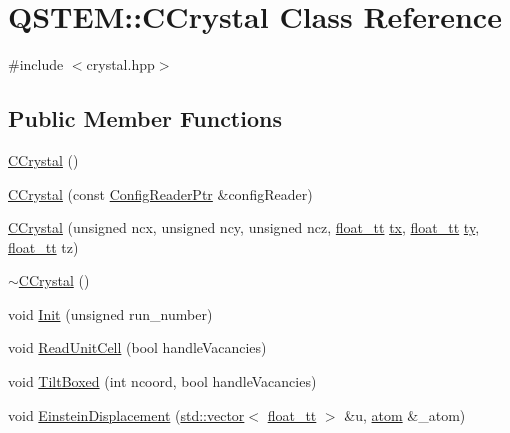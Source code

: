 \hypertarget{class_q_s_t_e_m_1_1_c_crystal}{\section{Q\-S\-T\-E\-M\-:\-:C\-Crystal Class Reference}
\label{class_q_s_t_e_m_1_1_c_crystal}
}


{\ttfamily \#include $<$crystal.\-hpp$>$}

\subsection*{Public Member Functions}
\begin{DoxyCompactItemize}
\item 
\hyperlink{class_q_s_t_e_m_1_1_c_crystal_ac9068f4a3798963697e9f804477f0486}{C\-Crystal} ()
\item 
\hyperlink{class_q_s_t_e_m_1_1_c_crystal_a97daa385f46bb4656053ac5f382a1159}{C\-Crystal} (const \hyperlink{namespace_q_s_t_e_m_af9424707fe9f6503298f49b41304bd35}{Config\-Reader\-Ptr} \&config\-Reader)
\item 
\hyperlink{class_q_s_t_e_m_1_1_c_crystal_a7f441c23bbf66862185ba1746bb66134}{C\-Crystal} (unsigned ncx, unsigned ncy, unsigned ncz, \hyperlink{namespace_q_s_t_e_m_a915d7caa497280d9f927c4ce8d330e47}{float\-\_\-tt} \hyperlink{image_sim_8m_a34b20e3956ba06c0f792cff638706a9b}{tx}, \hyperlink{namespace_q_s_t_e_m_a915d7caa497280d9f927c4ce8d330e47}{float\-\_\-tt} \hyperlink{image_sim_8m_a4f22a4b4bcbe105cc8a7bbeb24eaa0dc}{ty}, \hyperlink{namespace_q_s_t_e_m_a915d7caa497280d9f927c4ce8d330e47}{float\-\_\-tt} tz)
\item 
\hyperlink{class_q_s_t_e_m_1_1_c_crystal_aeeb8b840522be3403356ebc5b557c31b}{$\sim$\-C\-Crystal} ()
\item 
void \hyperlink{class_q_s_t_e_m_1_1_c_crystal_aaa08f887d6c9806638f0acb4c96b8b72}{Init} (unsigned run\-\_\-number)
\item 
void \hyperlink{class_q_s_t_e_m_1_1_c_crystal_af3dc7d45f2b35479658afb83c74d9912}{Read\-Unit\-Cell} (bool handle\-Vacancies)
\item 
void \hyperlink{class_q_s_t_e_m_1_1_c_crystal_a0eac3616a65e156a9441dabbbca74e1f}{Tilt\-Boxed} (int ncoord, bool handle\-Vacancies)
\item 
void \hyperlink{class_q_s_t_e_m_1_1_c_crystal_a7d347f1c86516e720e0e41823dafd62b}{Einstein\-Displacement} (\hyperlink{qmb_8m_af54b69a32590de218622e869b06b47b3}{std\-::vector}$<$ \hyperlink{namespace_q_s_t_e_m_a915d7caa497280d9f927c4ce8d330e47}{float\-\_\-tt} $>$ \&u, \hyperlink{namespace_q_s_t_e_m_a402dabc31a7a1fe906d0cdd138c69686}{atom} \&\-\_\-atom)

\end{DoxyCompactItemize}
